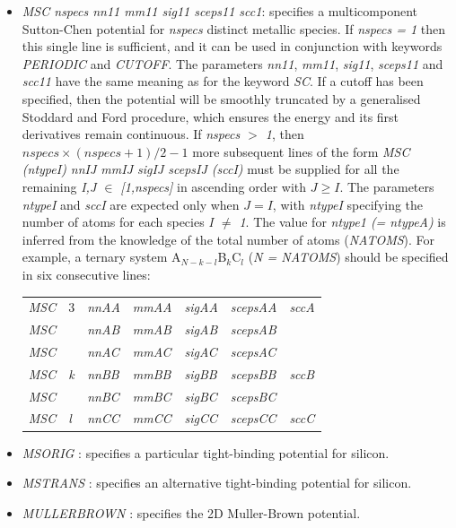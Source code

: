 \documentclass[12pt,a4paper,dvips]{article}
\begin{document}
\begin{itemize}
\item {\it MSC nspecs nn11 mm11 sig11 sceps11 scc1\/}: specifies a multicomponent Sutton-Chen potential for {\it nspecs} distinct metallic species. If {\it nspecs = 1\/} then this single line is sufficient, and it can be used in conjunction with keywords {\it PERIODIC\/} and {\it CUTOFF\/}. The parameters {\it nn11\/}, {\it mm11\/}, {\it sig11\/}, {\it sceps11\/} and {\it scc11\/} have the same meaning as for the keyword {\it SC\/}. If a cutoff has been specified, then the potential will be smoothly truncated by a generalised Stoddard and Ford procedure, which ensures the energy and its first derivatives remain continuous. If {\it nspecs $>$ 1\/}, then $ nspecs \times (nspecs + 1)/2 - 1$ more subsequent lines of the form {\it MSC (ntypeI) nnIJ mmIJ sigIJ scepsIJ (sccI)\/} must be supplied for all the remaining {\it I,J $\in$ [1,nspecs] \/} in ascending order with $J \geq I$. The parameters {\it ntypeI\/} and {\it sccI\/} are expected only when $J = I$, with {\it ntypeI\/} specifying the number of atoms for each species {\it I $\neq$ 1\/}. The value for {\it ntype1 (= ntypeA)\/} is inferred from the knowledge of the total number of atoms ({\it NATOMS\/}). For example, a ternary system A$_{N-k-l}$B$_{k}$C$_{l}$  ({\it N = NATOMS\/}) should be specified in six consecutive lines: \\
\begin{tabular}{lllllll}
{\it MSC} & 3 & {\it nnAA} & {\it mmAA} & {\it sigAA} & {\it scepsAA} & {\it sccA} \\
{\it MSC} &   & {\it nnAB} & {\it mmAB} & {\it sigAB} & {\it scepsAB} & \\
{\it MSC} &   & {\it nnAC} & {\it mmAC} & {\it sigAC} & {\it scepsAC} & \\
{\it MSC} & {\it k} & {\it nnBB} & {\it mmBB} & {\it sigBB} & {\it scepsBB} & {\it sccB} \\
{\it MSC} &   & {\it nnBC} & {\it mmBC} & {\it sigBC} & {\it scepsBC} & \\
{\it MSC} & {\it l} & {\it nnCC} & {\it mmCC} & {\it sigCC} & {\it scepsCC} & {\it sccC}
\end{tabular}

\item {\it MSORIG \/}: specifies a particular tight-binding potential for silicon.

\item {\it MSTRANS \/}: specifies an alternative tight-binding potential for silicon.

\item {\it MULLERBROWN \/}: specifies the 2D Muller-Brown potential.


\end{itemize}
\end{document}
